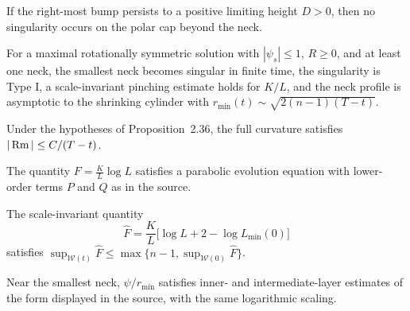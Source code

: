 \begin{lemma}
\label{ch02-lem-neckpinch-no-polar-singularity}
If the right-most bump persists to a positive limiting height \(D>0\), then no
singularity occurs on the polar cap beyond the neck.
\end{lemma}

\begin{proposition}
\label{ch02-prop-neckpinch-typei-cylinder}
For a maximal rotationally symmetric solution with \(|\psi_s|\le 1\), \(R\ge 0\),
and at least one neck, the smallest neck becomes singular in finite time, the
singularity is Type I, a scale-invariant pinching estimate holds for \(K/L\),
and the neck profile is asymptotic to the shrinking cylinder with
\(r_{\min}(t)\sim \sqrt{2(n-1)(T-t)}\).
\end{proposition}

\begin{lemma}
\label{ch02-lem-neckpinch-typei-bound}
Under the hypotheses of Proposition~2.36, the full curvature satisfies
\(|\operatorname{Rm}|\le C/(T-t)\).
\end{lemma}

\begin{lemma}
\label{ch02-lem-neckpinch-F-evolution}
The quantity \(F=\frac{K}{L}\log L\) satisfies a parabolic evolution equation
with lower-order terms \(P\) and \(Q\) as in the source.
\end{lemma}

\begin{lemma}
\label{ch02-lem-neckpinch-Fhat-bound}
The scale-invariant quantity
\[
\hat F=\frac{K}{L}\bigl[\log L+2-\log L_{\min}(0)\bigr]
\]
satisfies \(\sup_{\mathcal W(t)}\hat F\le \max\{n-1,\sup_{\mathcal W(0)}\hat F\}\).
\end{lemma}

\begin{lemma}
\label{ch02-lem-neckpinch-neck-profile-estimates}
Near the smallest neck, \(\psi/r_{\min}\) satisfies inner- and
intermediate-layer estimates of the form displayed in the source, with the
same logarithmic scaling.
\end{lemma}

